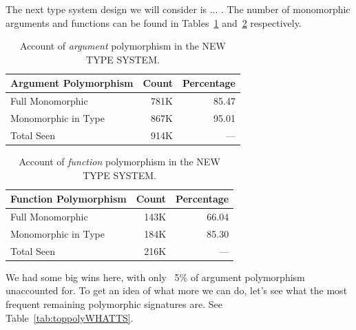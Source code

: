\documentclass[acmsmall,10pt,review,anonymous]{acmart}\settopmatter{printfolios=true,printccs=false,printacmref=false}
\begin{document}
The next type system design we will consider is ... .
The number of monomorphic arguments and functions can be found in Tables~\ref{tab:argcountsWHATTS} and~\ref{tab:funcountsWHATTS} respectively.

\begin{table}[ht]
\label{tab:argcountsWHATTS}
\centering
\begin{tabular}{lrr}
  \hline
 Argument Polymorphism & Count & Percentage \\ 
  \hline
  Full Monomorphic & 781K & 85.47 \\
  Monomorphic in Type & 867K & 95.01 \\
  Total Seen & 914K & --- \\ 
     \hline
\end{tabular}
\caption{Account of {\it argument} polymorphism in the NEW TYPE SYSTEM.}
\end{table}

\begin{table}[ht]
\label{tab:funcountsWHATTS}
\centering
\begin{tabular}{lrr}
  \hline
 Function Polymorphism & Count & Percentage \\ 
  \hline
  Full Monomorphic & 143K & 66.04 \\ 
  Monomorphic in Type & 184K & 85.30 \\
  Total Seen & 216K & --- \\ 
   \hline
\end{tabular}
\caption{Account of {\it function} polymorphism in the NEW TYPE SYSTEM.}
\end{table}

We had some big wins here, with only ~5\% of argument polymorphism unaccounted for.
To get an idea of what more we can do, let's see what the most frequent remaining polymorphic signatures are.
See Table~\ref{tab:toppolyWHATTS}.
\end{document}
